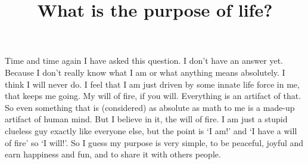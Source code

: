 \documentclass[12pt]{article}
\title{What is the purpose of life?}
\author{}
\begin{document}
\maketitle

Time and time again I have asked this question.
I don't have an answer yet.
Because I don't really know what I am or what anything means absolutely.
I think I will never do.
I feel that I am just driven by some innate life force in me, that keeps me going.
My will of fire, if you will.
Everything is an artifact of that.
So even something that is (considered) as absolute as math to me is a made-up artifact of human mind.
But I believe in it, the will of fire.
I am just a stupid clueless guy exactly like everyone else, but the point is `I am!' and `I have a will of fire' so `I will!'.
So I guess my purpose is very simple, to be peaceful, joyful and earn happiness and fun, and to share it with others people.
\end{document}
